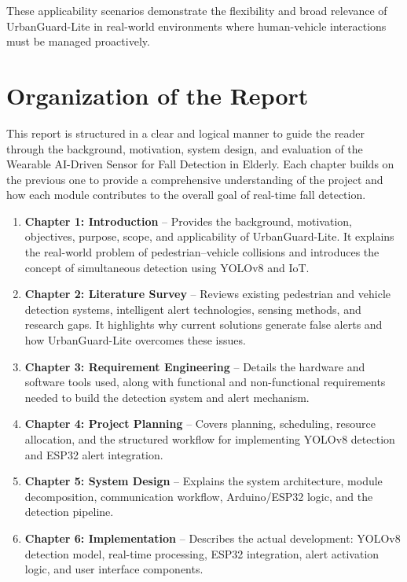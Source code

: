 \documentclass[a4paper, 12pt]{report}
\begin{document}
These applicability scenarios demonstrate the flexibility and broad relevance of UrbanGuard-Lite in real-world environments where human-vehicle interactions must be managed proactively.


\section{Organization of the Report}
This report is structured in a clear and logical manner to guide the reader through the background, motivation, system design, and evaluation of the Wearable AI-Driven Sensor for Fall Detection in Elderly. Each chapter builds on the previous one to provide a comprehensive understanding of the project and how each module contributes to the overall goal of real-time fall detection.

\begin{enumerate}[itemsep=-4pt, label=\textbf{\roman*.}]
    \item \textbf{Chapter 1: Introduction} -- 
Provides the background, motivation, objectives, purpose, scope, and applicability of UrbanGuard-Lite. 
It explains the real-world problem of pedestrian--vehicle collisions and introduces the concept of simultaneous detection using YOLOv8 and IoT.

\item \textbf{Chapter 2: Literature Survey} -- 
Reviews existing pedestrian and vehicle detection systems, intelligent alert technologies, sensing methods, and research gaps. 
It highlights why current solutions generate false alerts and how UrbanGuard-Lite overcomes these issues.

\item \textbf{Chapter 3: Requirement Engineering} -- 
Details the hardware and software tools used, along with functional and non-functional requirements needed to build the detection system and alert mechanism.

\item \textbf{Chapter 4: Project Planning} -- 
Covers planning, scheduling, resource allocation, and the structured workflow for implementing YOLOv8 detection and ESP32 alert integration.

\item \textbf{Chapter 5: System Design} -- 
Explains the system architecture, module decomposition, communication workflow, Arduino/ESP32 logic, and the detection pipeline.

\item \textbf{Chapter 6: Implementation} -- 
Describes the actual development: YOLOv8 detection model, real-time processing, ESP32 integration, alert activation logic, and user interface components.


\end{enumerate}
\end{document}
